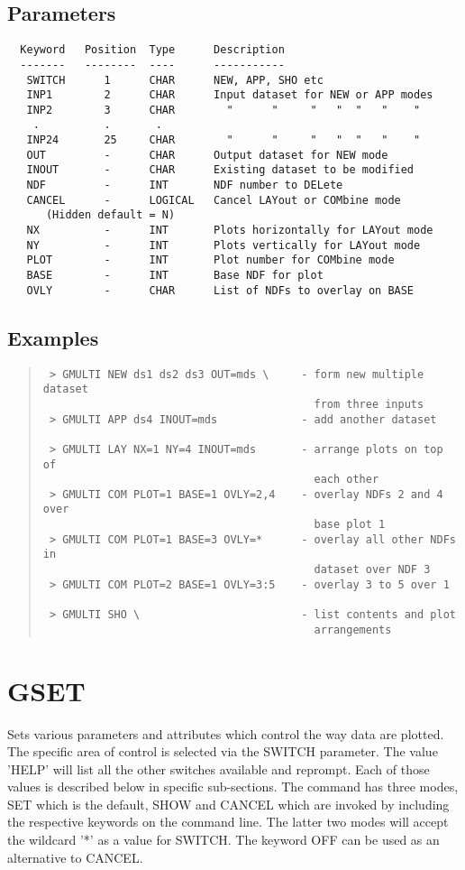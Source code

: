 \documentclass{book}
\renewcommand{\_}{{\tt\char'137}}     %
\begin{document}
\subsection{Parameters}
\begin{verbatim}
  Keyword   Position  Type      Description
  -------   --------  ----      -----------
   SWITCH      1      CHAR      NEW, APP, SHO etc
   INP1        2      CHAR      Input dataset for NEW or APP modes
   INP2        3      CHAR        "      "     "   "  "   "    "
    .          .       .
   INP24       25     CHAR        "      "     "   "  "   "    "
   OUT         -      CHAR      Output dataset for NEW mode
   INOUT       -      CHAR      Existing dataset to be modified
   NDF         -      INT       NDF number to DELete
   CANCEL      -      LOGICAL   Cancel LAYout or COMbine mode
      (Hidden default = N)
   NX          -      INT       Plots horizontally for LAYout mode
   NY          -      INT       Plots vertically for LAYout mode
   PLOT        -      INT       Plot number for COMbine mode
   BASE        -      INT       Base NDF for plot
   OVLY        -      CHAR      List of NDFs to overlay on BASE
\end{verbatim}\subsection{Examples}
\begin{quote}\begin{verbatim}
 > GMULTI NEW ds1 ds2 ds3 OUT=mds \     - form new multiple dataset
                                          from three inputs
 > GMULTI APP ds4 INOUT=mds             - add another dataset
 
 > GMULTI LAY NX=1 NY=4 INOUT=mds       - arrange plots on top of
                                          each other
 > GMULTI COM PLOT=1 BASE=1 OVLY=2,4    - overlay NDFs 2 and 4 over
                                          base plot 1
 > GMULTI COM PLOT=1 BASE=3 OVLY=*      - overlay all other NDFs in
                                          dataset over NDF 3
 > GMULTI COM PLOT=2 BASE=1 OVLY=3:5    - overlay 3 to 5 over 1
 
 > GMULTI SHO \                         - list contents and plot
                                          arrangements
\end{verbatim}\end{quote}
\section{GSET}
Sets various parameters and attributes which control the way data
are plotted. The specific area of control is selected via the
SWITCH parameter. The value 'HELP' will list all the other switches
available and reprompt. Each of those values is described below
in specific sub-sections. The command has three modes, SET which
is the default, SHOW and CANCEL which are invoked by including the
respective keywords on the command line. The latter two modes will
accept the wildcard '*' as a value for SWITCH. The keyword OFF can be
used as an alternative to CANCEL.
 
\end{document}

